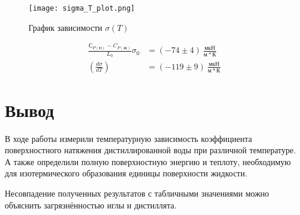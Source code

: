 \documentclass[a4paper, 12pt]{article}
\begin{document}
			\begin{figure}[!ht]
				\centering
				\texttt{[image: sigma\_T\_plot.png]}
				\caption{График зависимости $\sigma(T)$}
				\label{plot:dsigma_div_dT}
			\end{figure}



			\begin{align*}
				\frac{С_{P(П)} - C_{P(Ж)}}{L_0} \sigma_0 &= (-74 \pm 4)~\frac{мкН}{м*К}\\
				\left( \frac{d\sigma}{dT} \right) &= (-119 \pm 9)~\frac{мкН}{м*К}
			\end{align*}

	\section{Вывод}

		В ходе работы измерили температурную зависимость коэффициента поверхностного натяжения дистиллированной воды при различной температуре. А также определили полную поверхностную энергию и теплоту, необходимую для изотермического образования единицы поверхности жидкости.

		Несовпадение полученных результатов с табличными значениями можно объяснить загрязнённостью иглы и дистиллята.
\end{document}

